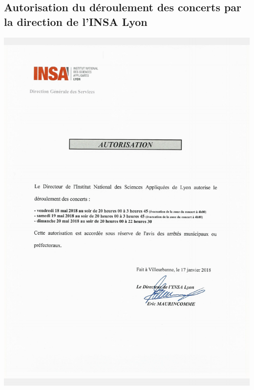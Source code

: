 \documentclass[hidelinks, paper=a4, fontsize=13pt]{report}
\begin{document}
\subsection{Autorisation du déroulement des concerts par la direction de l’INSA Lyon}
\begin{center}
	\includegraphics[scale=0.70]{Annexes/Documents/INSAAutorisationConcerts}
\end{center}
\end{document}
